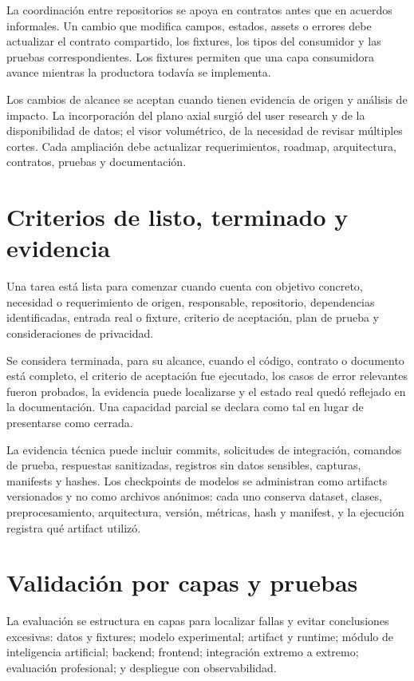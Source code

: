 La coordinación entre repositorios se apoya en contratos antes que en acuerdos informales. Un cambio que modifica campos, estados, assets o errores debe actualizar el contrato compartido, los fixtures, los tipos del consumidor y las pruebas correspondientes. Los fixtures permiten que una capa consumidora avance mientras la productora todavía se implementa.

Los cambios de alcance se aceptan cuando tienen evidencia de origen y análisis de impacto. La incorporación del plano axial surgió del user research y de la disponibilidad de datos; el visor volumétrico, de la necesidad de revisar múltiples cortes. Cada ampliación debe actualizar requerimientos, roadmap, arquitectura, contratos, pruebas y documentación.

\section{Criterios de listo, terminado y evidencia}

Una tarea está lista para comenzar cuando cuenta con objetivo concreto, necesidad o requerimiento de origen, responsable, repositorio, dependencias identificadas, entrada real o fixture, criterio de aceptación, plan de prueba y consideraciones de privacidad.

Se considera terminada, para su alcance, cuando el código, contrato o documento está completo, el criterio de aceptación fue ejecutado, los casos de error relevantes fueron probados, la evidencia puede localizarse y el estado real quedó reflejado en la documentación. Una capacidad parcial se declara como tal en lugar de presentarse como cerrada.

La evidencia técnica puede incluir commits, solicitudes de integración, comandos de prueba, respuestas sanitizadas, registros sin datos sensibles, capturas, manifests y hashes. Los checkpoints de modelos se administran como artifacts versionados y no como archivos anónimos: cada uno conserva dataset, clases, preprocesamiento, arquitectura, versión, métricas, hash y manifest, y la ejecución registra qué artifact utilizó.

\section{Validación por capas y pruebas}

La evaluación se estructura en capas para localizar fallas y evitar conclusiones excesivas: datos y fixtures; modelo experimental; artifact y runtime; módulo de inteligencia artificial; backend; frontend; integración extremo a extremo; evaluación profesional; y despliegue con observabilidad.

